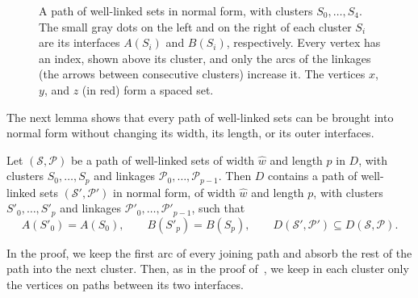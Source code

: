 \documentclass[fontsize=12pt,leading=14pt]{fullpaper}
\newcommand{\Pcal}{\mathcal{P}}
\newcommand{\Scal}{\mathcal{S}}
\begin{document}
\begin{figure}[ht]
  \centering
  \caption{A path of well-linked sets in normal form, with clusters $S_0,\dots,S_4$.
    The small gray dots on the left and on the right of each cluster $S_i$ are its interfaces $A(S_i)$ and $B(S_i)$, respectively.
    Every vertex has an index, shown above its cluster, and only the arcs of the linkages (the arrows between consecutive clusters) increase it.
  The vertices $x$, $y$, and $z$ (in red) form a spaced set.}
  \label{fig:stage2-normal}
\end{figure}

The next lemma shows that every path of well-linked sets can be brought into normal form without changing its width, its length, or its outer interfaces.

\begin{lemma}\label{lem:normalize}
  Let $(\Scal,\Pcal)$ be a path of well-linked sets of width $\hat w$ and length $p$ in $D$, with clusters $S_0,\dots,S_p$ and linkages $\Pcal_0,\dots,\Pcal_{p-1}$.
  Then $D$ contains a path of well-linked sets $(\Scal',\Pcal')$ in normal form, of width $\hat w$ and length $p$, with clusters $S'_0,\dots,S'_p$ and linkages $\Pcal'_0,\dots,\Pcal'_{p-1}$, such that
  \[
    A(S'_0)=A(S_0),\qquad B(S'_p)=B(S_p),\qquad D(\Scal',\Pcal')\subseteq D(\Scal,\Pcal).
  \]
\end{lemma}

In the proof, we keep the first arc of every joining path and absorb the rest of the path into the next cluster.
Then, as in the proof of~\cite[Observation~8.9]{HKMM26a}, we keep in each cluster only the vertices on paths between its two interfaces.
\end{document}
